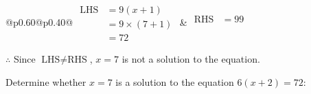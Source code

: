 \documentclass[12pt]{article}
\newcounter{minipagecount}
\begin{document}
\begin{multicols}{2}
\begin{minipage}[t]{0.40\textwidth}
    \renewcommand{\arraystretch}{1.3} %
    \begin{tabular}{@{}p{0.60\linewidth}@{}p{0.40\linewidth}@{}}
        \(\begin{aligned}
            \text{LHS} &= 9(x + 1) \\
                    &= 9 \times(7 + 1) \\
                    &= 72
        \end{aligned}\) &
        \(\begin{aligned}
            \text{RHS} &= 99\\
                    & \\
                    &
        \end{aligned}\)
    \end{tabular}
    \renewcommand{\arraystretch}{1.0} %
    \vspace{2pt}  %

    \noindent \(\therefore\) Since \(\text{LHS} \neq \text{RHS}\), \(x = 7\) is not  a solution to the equation.

\end{minipage}

 \vspace*{16pt}
\noindent{(\theminipagecount)}\hspace{0.1mm} %
\begin{minipage}[t]{0.40\textwidth} %

    \noindent Determine whether \(x = 7\) is a solution to the equation \(6(x + 2) = 72\):
    \vspace{4pt}  %

    \noindent


\end{minipage}
\end{multicols}
\end{document}

